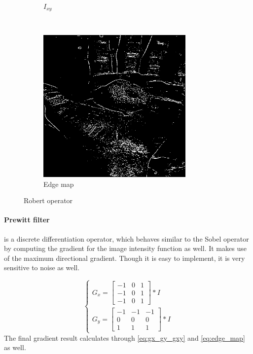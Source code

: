 \documentclass[12pt]{article}
\begin{document}
\begin{figure}[ht!]
\begin{subfigure}[t]{0.5\textwidth}
        \caption{$I_{xy}$}
    \end{subfigure}%
    ~
    \begin{subfigure}[t]{0.5\textwidth}
        \centering
        \includegraphics[height=3in]{images/robert_edge}
        \caption{Edge map}
    \end{subfigure}
    \caption{Robert operator}
\end{figure}

\paragraph*{Prewitt filter} is a discrete differentiation operator, which behaves similar to the Sobel operator by computing the gradient for the image intensity function as well.
It makes use of the maximum directional gradient. Though it is easy to implement, it is very sensitive to noise as well.

\begin{equation}
\label{eq:robert_op}
\begin{cases}
	G_x = \begin{bmatrix}
		-1 & 0 & 1 \\ -1 & 0 & 1 \\ -1 & 0 & 1 
	\end{bmatrix} \ast I\\
	G_y = \begin{bmatrix}
		-1 & -1 & -1 \\ 0 & 0 & 0 \\ 1 & 1 & 1
	\end{bmatrix} \ast I
\end{cases}
\end{equation}
The final gradient result calculates through \autoref{eq:gx_gy_gxy} and \autoref{eq:edge_map} as well.
\end{document}
